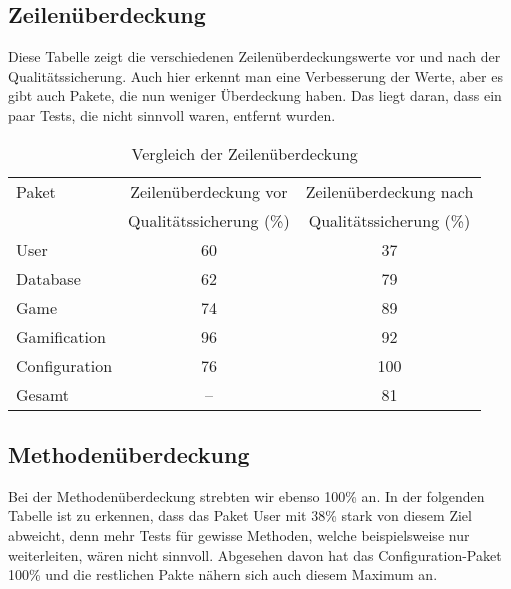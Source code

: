 \documentclass[a4paper]{scrreprt}
\begin{document}
    \newpage

    \subsection{Zeilenüberdeckung}
    Diese Tabelle zeigt die verschiedenen Zeilenüberdeckungswerte vor und nach der Qualitätssicherung. Auch hier erkennt man eine Verbesserung der Werte, aber es
    gibt auch Pakete, die nun weniger Überdeckung haben. Das liegt daran, dass ein paar Tests, die nicht sinnvoll waren, entfernt wurden.

    \vspace{20pt}
    \begin{table}[h]
        \begin{center}
        \begin{tabular}{ | l | c | c | }
            \hline
            Paket & Zeilenüberdeckung vor  & Zeilenüberdeckung nach \\
            & Qualitätssicherung (\%)  & Qualitätssicherung (\%) \\ \hline
            User & 60 & 37 \\
            Database & 62 & 79 \\
            Game & 74 & 89 \\
            Gamification & 96 & 92 \\
            Configuration & 76 & 100 \\
            Gesamt & -- & 81  \\
            \hline
        \end{tabular}
        \end{center}
        \caption{Vergleich der Zeilenüberdeckung}
    \end{table}%

    \subsection{Methodenüberdeckung}
    Bei der Methodenüberdeckung strebten wir ebenso 100\% an. In der folgenden Tabelle ist zu erkennen, dass das Paket User mit 38\% stark von diesem Ziel abweicht, denn mehr Tests für gewisse Methoden, welche beispielsweise nur weiterleiten,
    wären nicht sinnvoll. Abgesehen davon hat das Configuration-Paket 100\% und die restlichen Pakte nähern sich auch diesem Maximum an.
\end{document}

